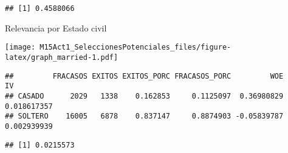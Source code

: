 \documentclass[]{article}
\newenvironment{Shaded}{\begin{snugshade}}{\end{snugshade}}
\newcommand{\KeywordTok}[1]{\textcolor[rgb]{0.13,0.29,0.53}{\textbf{#1}}}
\newcommand{\OperatorTok}[1]{\textcolor[rgb]{0.81,0.36,0.00}{\textbf{#1}}}
\newcommand{\NormalTok}[1]{#1}
\begin{document}
\begin{Shaded}
\end{Shaded}

\begin{verbatim}
## [1] 0.4588066
\end{verbatim}

Relevancia por Estado civil

\begin{Shaded}
\end{Shaded}

\texttt{[image: M15Act1\_SeleccionesPotenciales\_files/figure-latex/graph\_married-1.pdf]}

\begin{Shaded}
\end{Shaded}

\begin{verbatim}
##         FRACASOS EXITOS EXITOS_PORC FRACASOS_PORC         WOE          IV
## CASADO      2029   1338    0.162853     0.1125097  0.36980829 0.018617357
## SOLTERO    16005   6878    0.837147     0.8874903 -0.05839787 0.002939939
\end{verbatim}

\begin{Shaded}
\end{Shaded}

\begin{verbatim}
## [1] 0.0215573
\end{verbatim}
\end{document}
